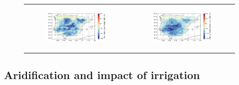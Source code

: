 \begin{figure}[htbp]
\begin{tabular}{cc}
        \begin{subfigure}[b]{0.5\textwidth}
            \caption{}
            \includegraphics[width=\textwidth]{images/chap4/future/diffmap_s_pblh_futirr.png}
        \end{subfigure} &
        \begin{subfigure}[b]{0.5\textwidth}
            \caption{}
            \includegraphics[width=\textwidth]{images/chap4/future/diffmap_s_lcl_futirr.png}
        \end{subfigure} \\
    \end{tabular}
    \caption{}
    \label{fig:diffmaps_future_irr}
\end{figure}

\clearpage

\subsection{Aridification and impact of irrigation}

